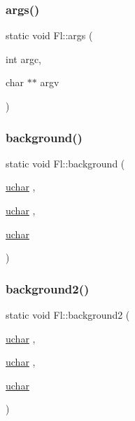\mbox{\label{class_fl_a17680a4bde1157bdfc9df4d7fad24df6}} 
\subsubsection{\texorpdfstring{args()}{args()}\hspace{0.1cm}{\footnotesize\ttfamily [2/2]}}
{\footnotesize\ttfamily static void Fl\+::args (\begin{DoxyParamCaption}\item[{int}]{argc,  }\item[{char $\ast$$\ast$}]{argv }\end{DoxyParamCaption})\hspace{0.3cm}{\ttfamily [static]}}

\mbox{\label{class_fl_a420479f3a3b1b45cbb198d244dda1a2b}} 
\subsubsection{\texorpdfstring{background()}{background()}}
{\footnotesize\ttfamily static void Fl\+::background (\begin{DoxyParamCaption}\item[{\hyperlink{fl__types_8h_a65f85814a8290f9797005d3b28e7e5fc}{uchar}}]{,  }\item[{\hyperlink{fl__types_8h_a65f85814a8290f9797005d3b28e7e5fc}{uchar}}]{,  }\item[{\hyperlink{fl__types_8h_a65f85814a8290f9797005d3b28e7e5fc}{uchar}}]{ }\end{DoxyParamCaption})\hspace{0.3cm}{\ttfamily [static]}}

\mbox{\label{class_fl_a9d9ca08a188df46e0a274fbb6d9d78bb}} 
\subsubsection{\texorpdfstring{background2()}{background2()}}
{\footnotesize\ttfamily static void Fl\+::background2 (\begin{DoxyParamCaption}\item[{\hyperlink{fl__types_8h_a65f85814a8290f9797005d3b28e7e5fc}{uchar}}]{,  }\item[{\hyperlink{fl__types_8h_a65f85814a8290f9797005d3b28e7e5fc}{uchar}}]{,  }\item[{\hyperlink{fl__types_8h_a65f85814a8290f9797005d3b28e7e5fc}{uchar}}]{ }\end{DoxyParamCaption})\hspace{0.3cm}{\ttfamily [static]}}

